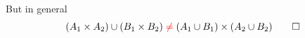 











But in general
\begin{equation}\label{eq:union-of-product}
(A_1\times A_2)\cup(B_1\times B_2)
\color{red}\neq\color{black}
(A_1 \cup B_1)\times(A_2 \cup B_2)
\qedhere
\end{equation}




